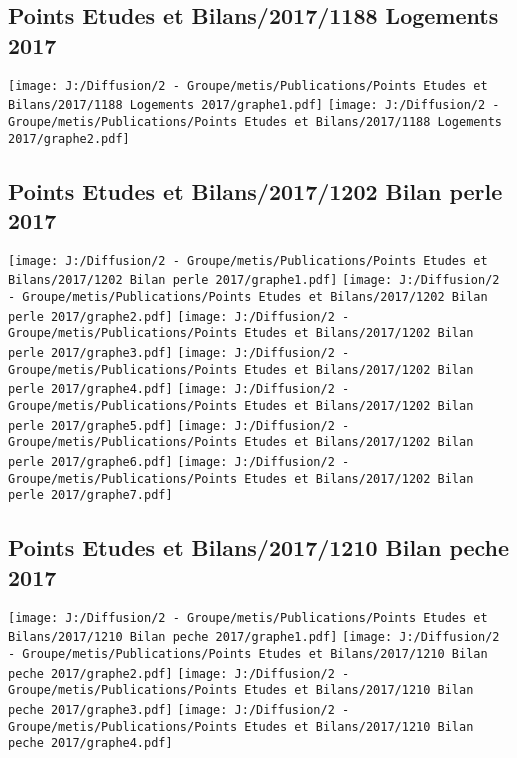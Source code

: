 \documentclass[
]{article}
\begin{document}
\hypertarget{points-etudes-et-bilans20171188-logements-2017}{%
\subsection{Points Etudes et Bilans/2017/1188 Logements
2017}\label{points-etudes-et-bilans20171188-logements-2017}}

\texttt{[image: J:/Diffusion/2 - Groupe/metis/Publications/Points Etudes et Bilans/2017/1188 Logements 2017/graphe1.pdf]}
\texttt{[image: J:/Diffusion/2 - Groupe/metis/Publications/Points Etudes et Bilans/2017/1188 Logements 2017/graphe2.pdf]}

\hypertarget{points-etudes-et-bilans20171202-bilan-perle-2017}{%
\subsection{Points Etudes et Bilans/2017/1202 Bilan perle
2017}\label{points-etudes-et-bilans20171202-bilan-perle-2017}}

\texttt{[image: J:/Diffusion/2 - Groupe/metis/Publications/Points Etudes et Bilans/2017/1202 Bilan perle 2017/graphe1.pdf]}
\texttt{[image: J:/Diffusion/2 - Groupe/metis/Publications/Points Etudes et Bilans/2017/1202 Bilan perle 2017/graphe2.pdf]}
\texttt{[image: J:/Diffusion/2 - Groupe/metis/Publications/Points Etudes et Bilans/2017/1202 Bilan perle 2017/graphe3.pdf]}
\texttt{[image: J:/Diffusion/2 - Groupe/metis/Publications/Points Etudes et Bilans/2017/1202 Bilan perle 2017/graphe4.pdf]}
\texttt{[image: J:/Diffusion/2 - Groupe/metis/Publications/Points Etudes et Bilans/2017/1202 Bilan perle 2017/graphe5.pdf]}
\texttt{[image: J:/Diffusion/2 - Groupe/metis/Publications/Points Etudes et Bilans/2017/1202 Bilan perle 2017/graphe6.pdf]}
\texttt{[image: J:/Diffusion/2 - Groupe/metis/Publications/Points Etudes et Bilans/2017/1202 Bilan perle 2017/graphe7.pdf]}

\hypertarget{points-etudes-et-bilans20171210-bilan-peche-2017}{%
\subsection{Points Etudes et Bilans/2017/1210 Bilan peche
2017}\label{points-etudes-et-bilans20171210-bilan-peche-2017}}

\texttt{[image: J:/Diffusion/2 - Groupe/metis/Publications/Points Etudes et Bilans/2017/1210 Bilan peche 2017/graphe1.pdf]}
\texttt{[image: J:/Diffusion/2 - Groupe/metis/Publications/Points Etudes et Bilans/2017/1210 Bilan peche 2017/graphe2.pdf]}
\texttt{[image: J:/Diffusion/2 - Groupe/metis/Publications/Points Etudes et Bilans/2017/1210 Bilan peche 2017/graphe3.pdf]}
\texttt{[image: J:/Diffusion/2 - Groupe/metis/Publications/Points Etudes et Bilans/2017/1210 Bilan peche 2017/graphe4.pdf]}
\end{document}
